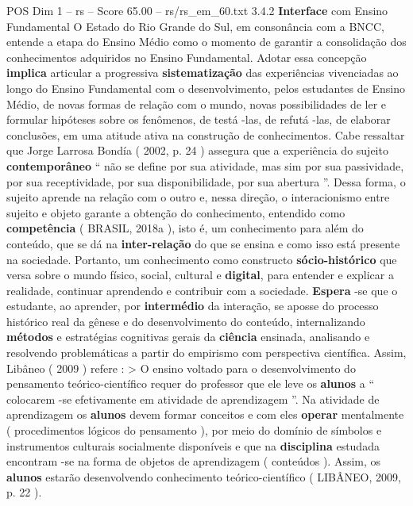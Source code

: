 \begin{textsample}{POS Dim 1 – rs – Score 65.00 – rs/rs\_em\_60.txt}  \label{ex:f1_pos_201}
3.4.2 \textbf{Interface} com Ensino Fundamental O Estado do Rio Grande do Sul, em consonância com a BNCC, entende a etapa do Ensino Médio como o momento de garantir a consolidação dos conhecimentos adquiridos no Ensino Fundamental.
Adotar essa concepção \textbf{implica} articular a progressiva \textbf{sistematização} das experiências vivenciadas ao longo do Ensino Fundamental com o desenvolvimento, pelos estudantes de Ensino Médio, de novas formas de relação com o mundo, novas possibilidades de ler e formular hipóteses sobre os fenômenos, de testá -las, de refutá -las, de elaborar conclusões, em uma atitude ativa na construção de conhecimentos.
Cabe ressaltar que Jorge Larrosa Bondía ( 2002, p. 24 ) assegura que a experiência do sujeito \textbf{contemporâneo} “ não se define por sua atividade, mas sim por sua passividade, por sua receptividade, por sua disponibilidade, por sua abertura ”.
Dessa forma, o sujeito aprende na relação com o outro e, nessa direção, o interacionismo entre sujeito e objeto garante a obtenção do conhecimento, entendido como \textbf{competência} ( BRASIL, 2018a ), isto é, um conhecimento para além do conteúdo, que se dá na \textbf{inter-relação} do que se ensina e como isso está presente na sociedade.
Portanto, um conhecimento como constructo \textbf{sócio-histórico} que versa sobre o mundo físico, social, cultural e \textbf{digital}, para entender e explicar a realidade, continuar aprendendo e contribuir com a sociedade. \textbf{Espera} -se que o estudante, ao aprender, por \textbf{intermédio} da interação, se aposse do processo histórico real da gênese e do desenvolvimento do conteúdo, internalizando \textbf{métodos} e estratégias cognitivas gerais da \textbf{ciência} ensinada, analisando e resolvendo problemáticas a partir do empirismo com perspectiva científica.
Assim, Libâneo ( 2009 ) refere : > O ensino voltado para o desenvolvimento do pensamento teórico-científico requer do professor que ele leve os \textbf{alunos} a “ colocarem -se efetivamente em atividade de aprendizagem ”.
Na atividade de aprendizagem os \textbf{alunos} devem formar conceitos e com eles \textbf{operar} mentalmente ( procedimentos lógicos do pensamento ), por meio do domínio de símbolos e instrumentos culturais socialmente disponíveis e que na \textbf{disciplina} estudada encontram -se na forma de objetos de aprendizagem ( conteúdos ).
Assim, os \textbf{alunos} estarão desenvolvendo conhecimento teórico-científico ( LIBÂNEO, 2009, p. 22 ).

\end{textsample}
